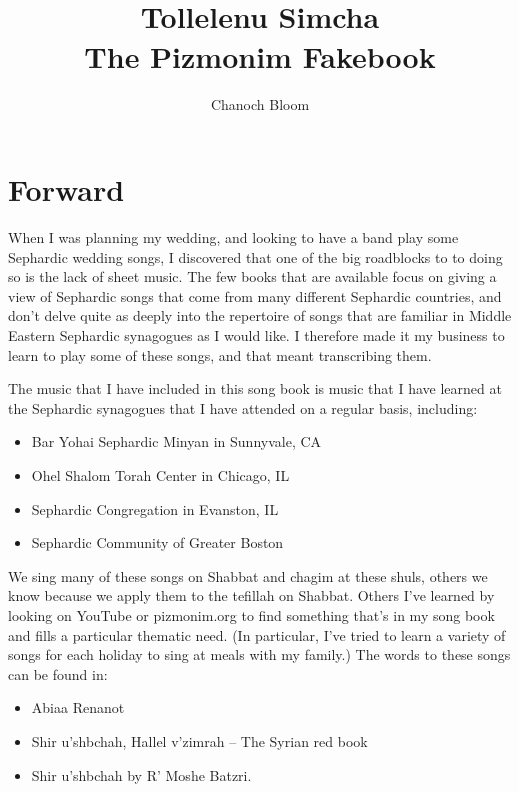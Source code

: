 \documentclass[letterpaper]{memoir}
\title{\RL{תוללנו שמחה} \\
Tollelenu Simcha \\
The Pizmonim Fakebook}
\author{Chanoch Bloom}
\begin{document}
\begin{titlingpage}
\maketitle
\end{titlingpage}

\setlength{\footskip}{72pt}
\pagestyle{plain}
\tableofcontents*

\chapter{Forward}

When I was planning my wedding, and looking to have a band play some 
Sephardic wedding songs, I discovered that one of the big roadblocks to 
to doing so is the lack of sheet music. The few books that are available 
focus on giving a view of Sephardic songs that come from many different 
Sephardic countries, and don't delve quite as deeply into the repertoire 
of songs that are familiar in Middle Eastern Sephardic synagogues as I 
would like. I therefore made it my business to learn to play some of 
these songs, and that meant transcribing them.

The music that I have included in this song book is music that I have 
learned at the Sephardic synagogues that I have attended on a regular 
basis, including:

\begin{itemize}
   \item Bar Yohai Sephardic Minyan in Sunnyvale, CA
   \item Ohel Shalom Torah Center in Chicago, IL
   \item Sephardic Congregation in Evanston, IL
   \item Sephardic Community of Greater Boston
\end{itemize}

We sing many of these songs on Shabbat and chagim at these shuls, others 
we know because we apply them to the tefillah on Shabbat. Others I've 
learned by looking on YouTube or pizmonim.org to find something that's 
in my song book and fills a particular thematic need. (In particular, 
I've tried to learn a variety of songs for each holiday to sing at meals 
with my family.) The words to these songs can be found in:

\begin{itemize}
   \item Abiaa Renanot
   \item Shir u'shbchah, Hallel v'zimrah -- The Syrian red book
   \item Shir u'shbchah by R' Moshe Batzri.
\end{itemize}
\end{document}
